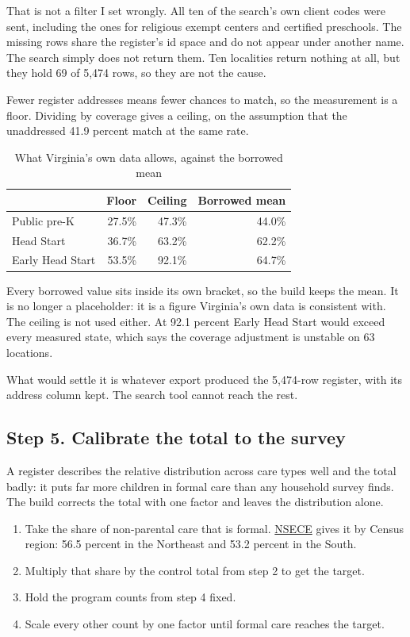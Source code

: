 \documentclass[11pt]{article}
\begin{document}
That is not a filter I set wrongly. All ten of the search's own client codes
were sent, including the ones for religious exempt centers and certified
preschools. The missing rows share the register's id space and do not appear
under another name. The search simply does not return them. Ten localities
return nothing at all, but they hold 69 of 5,474 rows, so they are not the
cause.

Fewer register addresses means fewer chances to match, so the measurement is a
floor. Dividing by coverage gives a ceiling, on the assumption that the
unaddressed 41.9 percent match at the same rate.

\begin{table}[H]
\centering
\caption{What Virginia's own data allows, against the borrowed mean}
\begin{tabular}{L{4.6cm}rrr}
\toprule
& \textbf{Floor} & \textbf{Ceiling} & \textbf{Borrowed mean} \\
\midrule
Public pre-K     & 27.5\% & 47.3\% & 44.0\% \\
Head Start       & 36.7\% & 63.2\% & 62.2\% \\
Early Head Start & 53.5\% & 92.1\% & 64.7\% \\
\bottomrule
\end{tabular}
\end{table}

Every borrowed value sits inside its own bracket, so the build keeps the mean.
It is no longer a placeholder: it is a figure Virginia's own data is consistent
with. The ceiling is not used either. At 92.1 percent Early Head Start would
exceed every measured state, which says the coverage adjustment is unstable on
63 locations.

What would settle it is whatever export produced the 5,474-row register, with
its address column kept. The search tool cannot reach the rest.

\subsection*{Step 5. Calibrate the total to the survey}

A register describes the relative distribution across care types well and the
total badly: it puts far more children in formal care than any household survey
finds. The build corrects the total with one factor and leaves the distribution
alone.

\begin{enumerate}
\setlength{\itemsep}{0.35em}
\item Take the share of non-parental care that is formal.
      \href{https://www.icpsr.umich.edu/web/ICPSR/studies/37941}{NSECE} gives it
      by Census region: 56.5 percent in the Northeast and 53.2 percent in the
      South.
\item Multiply that share by the control total from step 2 to get the target.
\item Hold the program counts from step 4 fixed.
\item Scale every other count by one factor until formal care reaches the target.
\end{enumerate}
\end{document}
